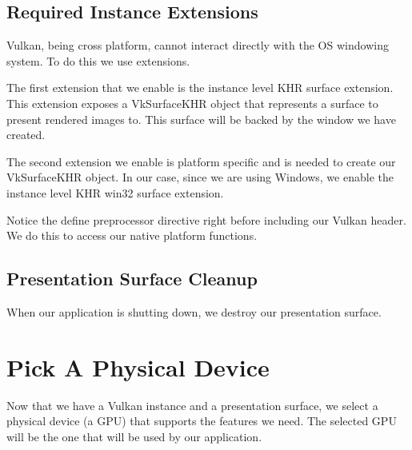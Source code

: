 \subsection{Required Instance Extensions}

Vulkan, being cross platform, cannot interact directly with the OS windowing system.
To do this we use extensions.

The first extension that we enable is the instance level KHR surface extension.
This extension exposes a VkSurfaceKHR object that represents a surface to present
rendered images to.
This surface will be backed by the window we have created.

The second extension we enable is platform specific and is needed
to create our VkSurfaceKHR object.
In our case, since we are using Windows, we enable the instance level KHR win32
surface extension.

\begin{minipage}{\linewidth}{\noindent}
    
\end{minipage}

Notice the define preprocessor directive right before including our Vulkan header.
We do this to access our native platform functions.

\subsection{Presentation Surface Cleanup}

When our application is shutting down, we destroy our presentation surface.

\begin{minipage}{\linewidth}{\noindent}
    
\end{minipage}

\section{Pick A Physical Device}

Now that we have a Vulkan instance and a presentation surface, we select
a physical device (a GPU) that supports the features we need.
The selected GPU will be the one that will be used by our application.


